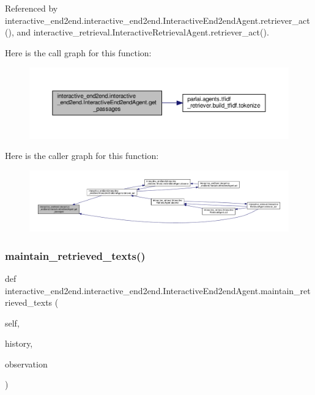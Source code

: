 Referenced by interactive\+\_\+end2end.\+interactive\+\_\+end2end.\+Interactive\+End2end\+Agent.\+retriever\+\_\+act(), and interactive\+\_\+retrieval.\+Interactive\+Retrieval\+Agent.\+retriever\+\_\+act().

Here is the call graph for this function\+:
\nopagebreak
\begin{figure}[H]
\begin{center}
\leavevmode
\includegraphics[width=350pt]{classinteractive__end2end_1_1interactive__end2end_1_1InteractiveEnd2endAgent_a47de7bd0acb24fb9d76d6d1555253e9f_cgraph}
\end{center}
\end{figure}
Here is the caller graph for this function\+:
\nopagebreak
\begin{figure}[H]
\begin{center}
\leavevmode
\includegraphics[width=350pt]{classinteractive__end2end_1_1interactive__end2end_1_1InteractiveEnd2endAgent_a47de7bd0acb24fb9d76d6d1555253e9f_icgraph}
\end{center}
\end{figure}
\mbox{\label{classinteractive__end2end_1_1interactive__end2end_1_1InteractiveEnd2endAgent_a76bebd5d1faa6d6aa243984106ee96d8}} 
\subsubsection{\texorpdfstring{maintain\+\_\+retrieved\+\_\+texts()}{maintain\_retrieved\_texts()}}
{\footnotesize\ttfamily def interactive\+\_\+end2end.\+interactive\+\_\+end2end.\+Interactive\+End2end\+Agent.\+maintain\+\_\+retrieved\+\_\+texts (\begin{DoxyParamCaption}\item[{}]{self,  }\item[{}]{history,  }\item[{}]{observation }\end{DoxyParamCaption})}

